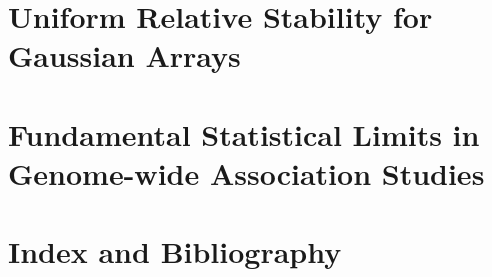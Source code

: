 \documentclass[graybox,envcountchap,sectrefs]{svmono}
\newcommand\comment[1]{{}}
\begin{document}
\chapter{\comment{Characterization of} Uniform Relative Stability for Gaussian Arrays}
\label{chap:URS}



\chapter{\comment{The Phase Transition Phenomena in}
Fundamental Statistical Limits in Genome-wide Association Studies} 
\label{chap:GWAS}





%
%
%

\backmatter%

%
%


\chapter{Index and Bibliography}

\printindex




\end{document}
